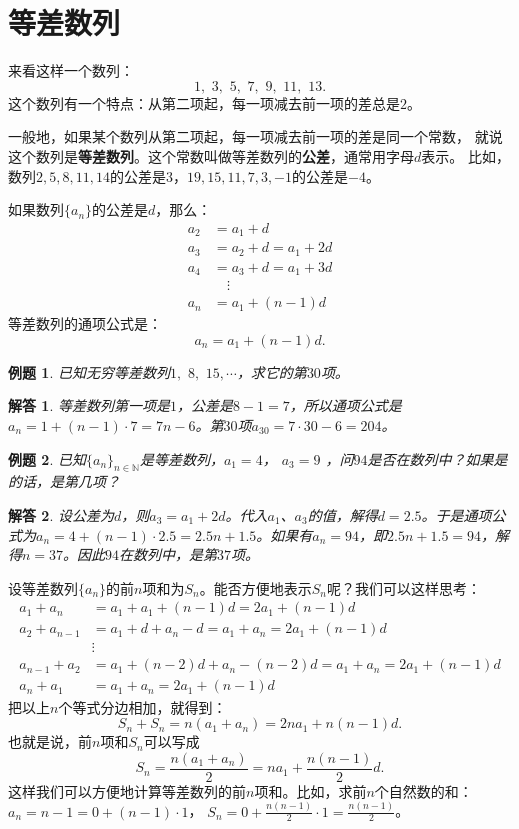 \documentclass[12pt,UTF8]{ctexbook}
\newtheorem{et}{例题}[section]
\newtheorem*{so}{解答}
\begin{document}
\section{等差数列}
来看这样一个数列：
$$ 1,\,\,3,\,\,5,\,\,7,\,\,9,\,\,11,\,\, 13. $$
这个数列有一个特点：从第二项起，每一项减去前一项的差总是$2$。

一般地，如果某个数列从第二项起，每一项减去前一项的差是同一个常数，
就说这个数列是\textbf{等差数列}。这个常数叫做等差数列的\textbf{公差}，通常用字母$d$表示。
比如，数列$2,5,8,11,14$的公差是$3$，$19,15,11,7,3,-1$的公差是$-4$。

如果数列$\{a_n\}$的公差是$d$，那么：
\begin{align*}
a_2 &= a_1 + d  \\
a_3 &= a_2 + d = a_1 + 2d  \\
a_4 &= a_3 + d = a_1 + 3d  \\
&\quad \vdots  \\
a_n &= a_1 + (n-1)d  
\end{align*}
等差数列的通项公式是：
$$a_n = a_1 + (n-1)d.$$
\begin{et}
已知无穷等差数列$1,\,\,8,\,\,15, \cdots$，求它的第$30$项。
\end{et}
\begin{so}
等差数列第一项是$1$，公差是$8-1=7$，所以通项公式是$a_n = 1 + (n-1)\cdot 7 = 7n - 6$。第$30$项$a_{30} = 7\cdot 30 - 6 = 204$。
\end{so}
\begin{et}
已知$\{a_n\}_{n\in\mathbb{N}}$是等差数列，$a_1 = 4$， $a_3 = 9$ ，问$94$是否在数列中？如果是的话，是第几项？
\end{et}
\begin{so}
设公差为$d$，则$a_3 = a_1 + 2d$。代入$a_1$、$a_3$的值，解得$d = 2.5$。于是通项公式为$a_n = 4 + (n-1)\cdot 2.5 = 2.5n + 1.5$。如果有$a_n = 94$，即$2.5n + 1.5=94$，解得$n = 37$。因此$94$在数列中，是第$37$项。
\end{so}

设等差数列$\{a_n\}$的前$n$项和为$S_n$。能否方便地表示$S_n$呢？我们可以这样思考：
\begin{align*}
a_{1} + a_{n} &= a_1 + a_1 + (n-1)d = 2a_1 + (n-1)d  \\
a_{2} + a_{n-1} &= a_1 + d + a_n - d = a_1 + a_n = 2a_1 + (n-1)d  \\
&\vdots  \\
a_{n-1} + a_{2} &= a_1 + (n-2)d + a_n - (n-2)d = a_1 + a_n =  2a_1 + (n-1)d  \\
a_{n} + a_{1} &= a_1 + a_n = 2a_1 + (n-1)d  
\end{align*}
把以上$n$个等式分边相加，就得到：
$$ S_n + S_n = n(a_1 + a_n) = 2na_1 + n(n-1)d. $$
也就是说，前$n$项和$S_n$可以写成
$$ S_n = \frac{n(a_1 + a_n)}{2} = na_1 + \frac{n(n-1)}{2}d. $$
这样我们可以方便地计算等差数列的前$n$项和。比如，求前$n$个自然数的和：$a_n = n-1 = 0 + (n-1)\cdot 1$，
$S_n = 0 + \frac{n(n-1)}{2}\cdot 1 = \frac{n(n-1)}{2}$。
\end{document}
